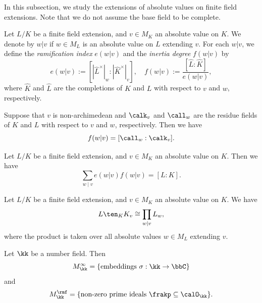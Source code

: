     In this subsection, we study the extensions of absolute values on finite field extensions.
    Note that we do not assume the base field to be complete.

    \begin{definition}\label{def:ramification_and_inertation_index}
        Let \(L/K\) be a finite field extension, and \(v \in M_K\) an absolute value on \(K\).
        We denote by \(w | v\) if \(w \in M_L\) is an absolute value on \(L\) extending \(v\).
        For each \(w | v\), we define the \emph{ramification index} \(e(w|v)\) and the \emph{inertia degree} \(f(w|v)\) by
        \[
            e(w|v) := [|\widehat{L}^\times|_w : |\widehat{K}^\times|_v], \quad f(w|v) := \frac{[\widehat{L}: \widehat{K}]}{e(w|v)},
        \]
        where \(\widehat{K}\) and \(\widehat{L}\) are the completions of \(K\) and \(L\) with respect to \(v\) and \(w\), respectively.
    \end{definition}

    \begin{lemma}\label{lem:inertia_index_and_degree_of_extensions_of_residue_fields}
        Suppose that \(v\) is non-archimedean and \(\calk_v\) and \(\call_w\) are the residue fields of \(K\) and \(L\) with respect to \(v\) and \(w\), respectively.
        Then we have
        \[
            f(w|v) = [\call_w : \calk_v].
        \]
    \end{lemma}

    \begin{remark}\label{rmk:definition_of_inertia_index}
    \end{remark}

    \begin{theorem}\label{prop:efg_relation_for_the_extensions_of_absolute_value}
        Let \(L/K\) be a finite field extension, and \(v \in M_K\) an absolute value on \(K\). Then we have
        \[
            \sum_{w \mid v} e(w|v) f(w|v) = [L : K].
        \]
    \end{theorem}

    Let \(L/K\) be a finite field extension, and \(v \in M_K\) an absolute value on \(K\).
    We have 
    \[ L \ten_K K_v \cong \prod_{w \mid v} L_w, \]
    where the product is taken over all absolute values \(w \in M_L\) extending \(v\).


    \begin{theorem}\label{thm:place_of_number_fields}
        Let \(\kk\) be a number field.
        Then 
        \[ M_\kk^\infty = \{\text{embeddings } \sigma: \kk \to \bbC\} \]
        and
        \[ M_\kk^\rmf = \{\text{non-zero prime ideals } \frakp \subseteq \calO_\kk\}. \]
    \end{theorem}

